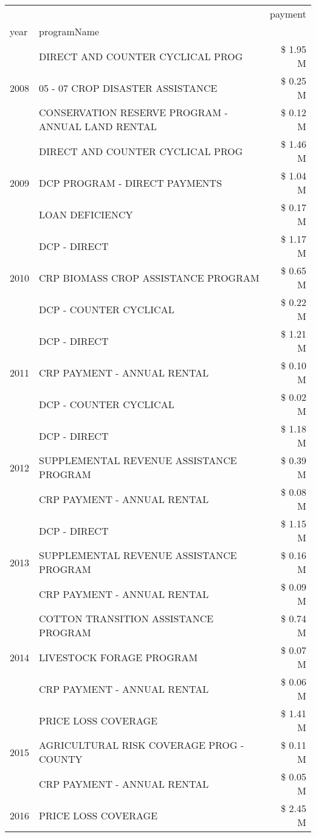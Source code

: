 \begin{tabular}{llr}
\toprule
 &  & payment \\
year & programName &  \\
\midrule
\multirow[t]{3}{*}{2008} & DIRECT AND COUNTER CYCLICAL PROG & \$ 1.95 M \\
 & 05 - 07 CROP DISASTER ASSISTANCE & \$ 0.25 M \\
 & CONSERVATION RESERVE PROGRAM - ANNUAL LAND RENTAL & \$ 0.12 M \\
\cline{1-3}
\multirow[t]{3}{*}{2009} & DIRECT AND COUNTER CYCLICAL PROG & \$ 1.46 M \\
 & DCP PROGRAM - DIRECT PAYMENTS & \$ 1.04 M \\
 & LOAN DEFICIENCY & \$ 0.17 M \\
\cline{1-3}
\multirow[t]{3}{*}{2010} & DCP - DIRECT & \$ 1.17 M \\
 & CRP BIOMASS CROP ASSISTANCE PROGRAM & \$ 0.65 M \\
 & DCP - COUNTER CYCLICAL & \$ 0.22 M \\
\cline{1-3}
\multirow[t]{3}{*}{2011} & DCP - DIRECT & \$ 1.21 M \\
 & CRP PAYMENT - ANNUAL RENTAL & \$ 0.10 M \\
 & DCP - COUNTER CYCLICAL & \$ 0.02 M \\
\cline{1-3}
\multirow[t]{3}{*}{2012} & DCP - DIRECT & \$ 1.18 M \\
 & SUPPLEMENTAL REVENUE ASSISTANCE PROGRAM & \$ 0.39 M \\
 & CRP PAYMENT - ANNUAL RENTAL & \$ 0.08 M \\
\cline{1-3}
\multirow[t]{3}{*}{2013} & DCP - DIRECT & \$ 1.15 M \\
 & SUPPLEMENTAL REVENUE ASSISTANCE PROGRAM & \$ 0.16 M \\
 & CRP PAYMENT - ANNUAL RENTAL & \$ 0.09 M \\
\cline{1-3}
\multirow[t]{3}{*}{2014} & COTTON TRANSITION ASSISTANCE PROGRAM & \$ 0.74 M \\
 & LIVESTOCK FORAGE PROGRAM & \$ 0.07 M \\
 & CRP PAYMENT - ANNUAL RENTAL & \$ 0.06 M \\
\cline{1-3}
\multirow[t]{3}{*}{2015} & PRICE LOSS COVERAGE & \$ 1.41 M \\
 & AGRICULTURAL RISK COVERAGE PROG - COUNTY & \$ 0.11 M \\
 & CRP PAYMENT - ANNUAL RENTAL & \$ 0.05 M \\
\cline{1-3}
\multirow[t]{3}{*}{2016} & PRICE LOSS COVERAGE & \$ 2.45 M \\

\end{tabular}

